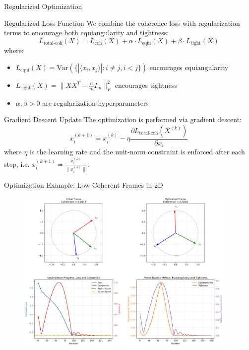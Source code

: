 \documentclass[9pt,dvipsnames]{beamer}
\begin{document}
\begin{frame}{Regularized Optimization}

	\begin{block}{Regularized Loss Function}
		We combine the coherence loss with regularization terms to encourage both equiangularity and tightness:
		\begin{equation*}
			L_{\text{total-coh}}(X) = L_{\text{coh}}(X) + \alpha \cdot L_{\text{equi}}(X) + \beta \cdot L_{\text{tight}}(X)
		\end{equation*}
		where:
		\begin{itemize}
			\item $L_{\text{equi}}(X) = \text{Var}\left(\{|\langle x_i, x_j \rangle| : i \neq j, i < j\}\right)$ encourages equiangularity
			\item $L_{\text{tight}}(X) = \|XX^T - \frac{n}{m}I_m\|_F^2$ encourages tightness
			\item $\alpha, \beta > 0$ are regularization hyperparameters
		\end{itemize}
	\end{block}

	\begin{block}{Gradient Descent Update}
		The optimization is performed via gradient descent:
		\begin{equation*}
			x_i^{(k+1)} = x_i^{(k)} - \eta \frac{\partial L_{\text{total-coh}}(X^{(k)})}{\partial x_i}
		\end{equation*}
		where $\eta$ is the learning rate and the unit-norm constraint is enforced after each step, i.e. $x_i^{(k+1)} = \frac{x_i^{(k)}}{\|x_i^{(k)}\|}$.
	\end{block}

\end{frame}
\begin{frame}{Optimization Example: Low Coherent Frames in 2D}
	\begin{figure}[h]
		\centering
		\includegraphics[width=0.95\textwidth]{../plots/frame_optimization_m2_n3_iter200_seed42_alpha0.1_beta0.1.png}
	\end{figure}
\end{frame}
\end{document}
